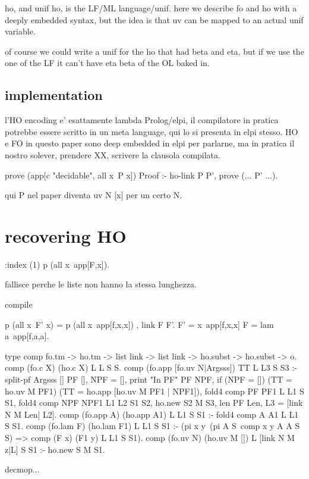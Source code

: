\documentclass[sigconf,natbib=false]{acmart}
\begin{document}
ho, and unif ho, is the LF/ML language/unif. here we describe fo and ho
with a deeply embedded syntax, but the idea is that uv can be mapped to
an actual unif variable.

of course we could write a unif for the ho that had beta and eta,
but if we use the one of the LF it can't have eta beta of the OL baked in.

\subsection{implementation}

l'HO encoding e' esattamente lambda Prolog/elpi, il compilatore
in pratica potrebbe essere scritto in un meta language, qui lo si presenta in
elpi stesso. HO e FO in questo paper sono deep embedded in elpi per parlarne,
ma in pratica il nostro solever, prendere XX, scrivere la clausola compilata.

\begin{elpicode}
prove (app[c "decidable", all x\ P x]) Proof :- ho-link P P', prove (... P' ...).
\end{elpicode}

qui P nel paper diventa uv N [x] per un certo N.

\section{recovering HO}

\begin{elpicode}
  :index (1)
  p (all x\ app[F,x]).
\end{elpicode}

fallisce perche le liste non hanno la stessa lunghezza.


compile

\begin{elpicode}
  p (all x\ F' x) = p (all x\ app[f,x,x]) , link F F'.
  F' = x\ app[f,x,x]
  F = lam a\ app[f,a,a].
\end{elpicode}

\begin{elpicode}
  type comp fo.tm -> ho.tm -> list link -> list link -> ho.subst -> ho.subst -> o.
  comp (fo.c X)   (ho.c X) L L S S.
  comp (fo.app [fo.uv N|Argsss]) TT L L3 S S3 :- %
    split-pf Argsss [] PF [], NPF = [], %
    print "In PF" PF NPF, 
    if (NPF = []) (TT = ho.uv M PF1) (TT = ho.app [ho.uv M PF1 | NPF1]),
    fold4 comp PF PF1 L L1 S S1,
    fold4 comp NPF NPF1 L1 L2 S1 S2,
    ho.new S2 M S3,
    len PF Len,
    L3 = [link N M Len| L2].
  comp (fo.app A) (ho.app A1) L L1 S S1 :- fold4 comp A A1 L L1 S S1.
  comp (fo.lam F) (ho.lam F1) L L1 S S1 :- 
    (pi x y\ (pi A S\ comp x y A A S S) => comp (F x) (F1 y) L L1 S S1).
  comp (fo.uv N) (ho.uv M []) L [link N M z|L] S S1 :- ho.new S M S1.

  decmop...
\end{elpicode}
\end{document}
